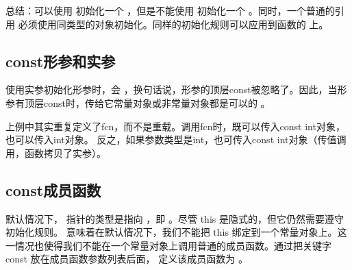 \documentclass[letterpaper,10pt,english]{sphinxmanual}
\begin{document}
总结：可以使用  初始化一个  ，但是不能使用  初始化一个  。同时，一个普通的引用
必须使用同类型的对象初始化。同样的初始化规则可以应用到函数的  上。


\subsection{const形参和实参}
\label{\detokenize{cpp/22_const:id1}}
使用实参初始化形参时，会  ，换句话说，形参的顶层const被忽略了。因此，当形参有顶层const时，传给它常量对象或非常量对象都是可以的 。

%
\begin{sphinxVerbatim}[commandchars=\\\{\}]
    
    
\end{sphinxVerbatim}

上例中其实重复定义了fcn，而不是重载。调用fcn时，既可以传入const int对象，也可以传入int对象。
反之，如果参数类型是int，也可传入const int对象（传值调用，函数拷贝了实参）。


\subsection{const成员函数}
\label{\detokenize{cpp/22_const:id2}}
默认情况下， 指针的类型是指向  ，即  。尽管 this 是隐式的，但它仍然需要遵守初始化规则。
意味着在默认情况下，我们不能把 this 绑定到一个常量对象上。这一情况也使得我们不能在一个常量对象上调用普通的成员函数。通过把关键字 const 放在成员函数参数列表后面，
定义该成员函数为  。

%
\begin{sphinxVerbatim}[commandchars=\\\{\}]
 
    
\end{sphinxVerbatim}
\end{document}
